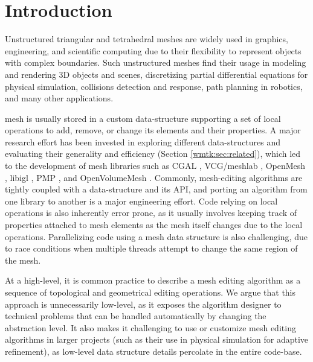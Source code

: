 
\section{Introduction}

Unstructured triangular and tetrahedral meshes are widely used in graphics, engineering, and scientific computing due to their flexibility to represent objects with complex boundaries. Such unstructured meshes find their usage in modeling and rendering 3D objects and scenes, discretizing partial differential equations for physical simulation,  collisions detection and response, path planning in robotics, and many other applications.

 mesh is usually stored in a custom data-structure supporting a set of local operations to add, remove, or change its elements and their properties. A major research effort has been invested in exploring different data-structures and evaluating their generality and efficiency (Section \ref{wmtk:sec:related}), which led to the development of mesh libraries such as CGAL \cite{cgal2008computational}, VCG/meshlab \cite{vcg}, OpenMesh \cite{botsch2002openmesh}, libigl \cite{jacobson2016libigl}, PMP \cite{pmp-library}, and OpenVolumeMesh \cite{kremer2013openvolumemesh}.
Commonly, mesh-editing algorithms are tightly coupled with a data-structure and its API, and porting an algorithm from one library to another is a major engineering effort. 
Code relying on local operations is also inherently error prone, as it usually involves keeping track of properties attached to mesh elements as the mesh itself changes due to the local operations. Parallelizing code using a mesh data structure is also challenging, due to race conditions when multiple threads attempt to change the same region of the mesh. 

At a high-level, it is common practice to describe a mesh editing algorithm as a sequence of topological and geometrical editing operations. We argue that this approach is unnecessarily low-level, as it exposes the algorithm designer to technical problems that can be handled automatically by changing the abstraction level. It also makes it challenging to use or customize mesh editing algorithms in larger projects (such as their use in physical simulation for adaptive refinement), as low-level data structure details percolate in the entire code-base. 

